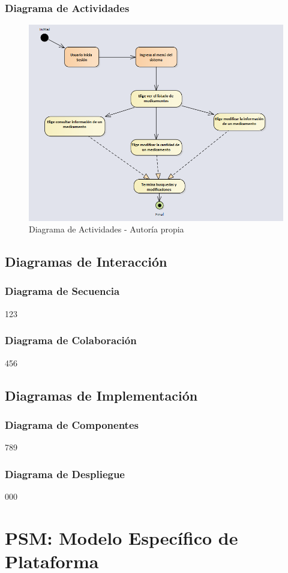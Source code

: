 \subsubsection{ Diagrama de Actividades}
\begin{center}
    \begin{figure}[htb]
        \centering
        \includegraphics[width = 1.0\textwidth] {libro/capitulo5/img/Actividades.PNG}
        \caption{Diagrama de Actividades - Autor\'ia propia}
        \label{fig:my_label}
    \end{figure}
\end{center}
\subsection{ Diagramas de Interacción}
\subsubsection{ Diagrama de Secuencia}
123
\subsubsection{ Diagrama de Colaboración}
456
\subsection{ Diagramas de Implementación}
\subsubsection{ Diagrama de Componentes}
789
\subsubsection{Diagrama de Despliegue}
000
\section{PSM: Modelo Específico de Plataforma}
